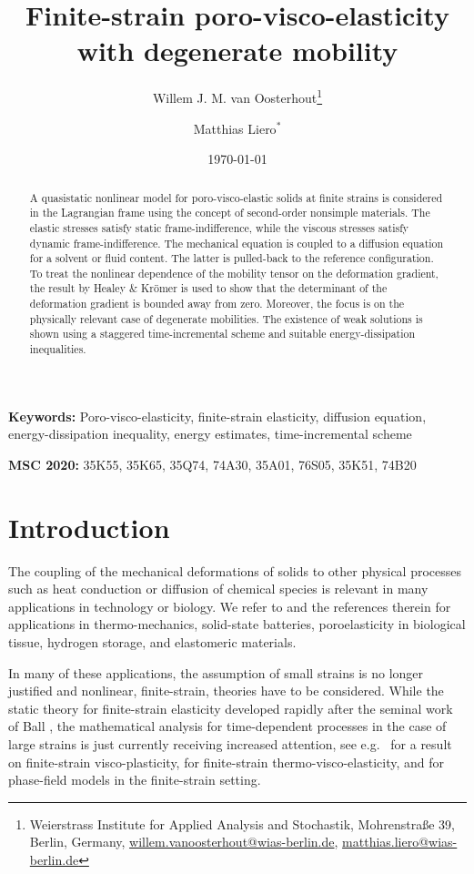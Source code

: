 \documentclass[a4paper,12pt]{article}
\title{Finite-strain poro-visco-elasticity\\ with degenerate mobility}
\author{Willem J. M. van Oosterhout\footnote{Weierstrass Institute for Applied Analysis and Stochastik, Mohrenstraße 39, Berlin, Germany, \url{willem.vanoosterhout@wias-berlin.de}, \url{matthias.liero@wias-berlin.de}} \and Matthias Liero$^\text{*}$}
\date{\today}
\theoremstyle{plain}
\theoremstyle{definition}
\numberwithin{equation}{section}
\begin{document}
\maketitle
\begin{abstract}
    A quasistatic nonlinear model for poro-visco-elastic solids at finite strains is considered in the Lagrangian frame using the concept of second-order nonsimple materials. The elastic stresses satisfy static frame-indifference, while the viscous stresses satisfy dynamic frame-indifference. The mechanical equation is coupled to a diffusion equation for a solvent or fluid content. The latter is pulled-back to the reference configuration. To treat 
	the nonlinear dependence of the mobility tensor on the deformation gradient, the result by Healey \& Krömer is used to show that the determinant of the deformation gradient is bounded away from zero. Moreover, the focus is on the physically relevant case of degenerate mobilities. 
	 The existence of weak solutions is shown using a staggered time-incremental scheme and suitable energy-dissipation inequalities. 
\end{abstract}

\textbf{Keywords:} Poro-visco-elasticity, finite-strain elasticity, diffusion equation, energy-dissipation inequality, energy estimates, time-incremental scheme

\vspace{1em}
\textbf{MSC 2020:} 35K55, 35K65, 35Q74, 74A30, 35A01, 
76S05, 35K51, 74B20


\section{Introduction}

The coupling of the  mechanical deformations of solids to other physical processes
such as heat conduction or diffusion of chemical species is relevant in many
applications in technology or biology.  We refer to \cite{MauBer1999MFFS,WLX*2020CPBT,Latr2004STPM,CaSeSa2022ECMS,HZZS2008TCDLDPG,CheAna2010CTFPLDEM} and the references therein for applications in thermo-mechanics, solid-state batteries, poroelasticity in biological tissue, hydrogen storage, and elastomeric materials. 

In many of these applications, the assumption of small strains is no longer justified and 
nonlinear, finite-strain, theories have to be considered. While the static theory for finite-strain elasticity 
developed rapidly after the seminal work 
of Ball \cite{Ball1977CIET}, 
the mathematical analysis for time-dependent processes in the case of large strains is just currently receiving increased attention,
see e.g.\ \cite{MiRoSa2018GERV}
for a result on finite-strain visco-plasticity, \cite{MieRou2020TVKVR,BaFrKr2023NaLMiTVE} 
for finite-strain thermo-visco-elasticity, and \cite{Roub2021CHEC,SchPes2023SILC} 
for phase-field models in the finite-strain setting. 
\end{document}
